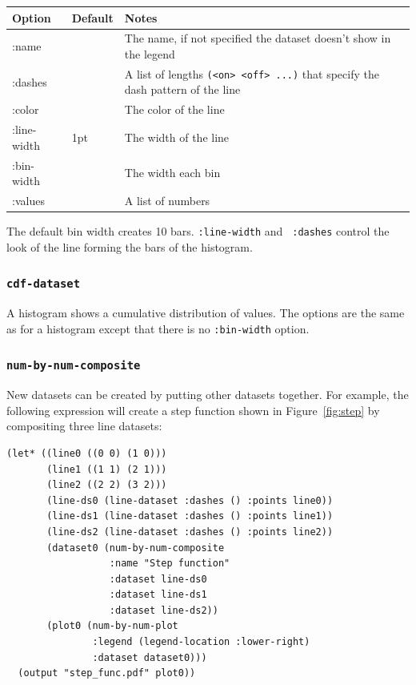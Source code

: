 \documentclass{article}
\begin{document}
\begin{center}
\begin{tabular}{lll}
Option & Default & Notes \\
\hline
:name & & The name, if not specified the dataset doesn't show in
the legend\\
:dashes & & A list of lengths {\tt (<on> <off> ...)} that specify the
dash pattern of the line\\
:color & & The color of the line\\
:line-width & 1pt & The width of the line\\
:bin-width &  & The width each bin\\
:values & & A list of numbers\\
\end{tabular}
\end{center}

The default bin width creates 10 bars.  {\tt :line-width} and {\tt
  :dashes} control the look of the line forming the bars of the
histogram.

\subsubsection{\tt cdf-dataset}

A histogram shows a cumulative distribution of values.
The options are the same as for a histogram except that there is no
{\tt :bin-width} option.

\subsubsection{\tt num-by-num-composite}

New datasets can be created by putting other datasets together.  For
example, the following expression will create a step function shown in
Figure~\ref{fig:step} by compositing three line datasets:

\begin{verbatim}
(let* ((line0 ((0 0) (1 0)))
       (line1 ((1 1) (2 1)))
       (line2 ((2 2) (3 2)))
       (line-ds0 (line-dataset :dashes () :points line0))
       (line-ds1 (line-dataset :dashes () :points line1))
       (line-ds2 (line-dataset :dashes () :points line2))
       (dataset0 (num-by-num-composite
                  :name "Step function"
                  :dataset line-ds0
                  :dataset line-ds1
                  :dataset line-ds2))
       (plot0 (num-by-num-plot
               :legend (legend-location :lower-right)
               :dataset dataset0)))
  (output "step_func.pdf" plot0))
\end{verbatim}
\end{document}
